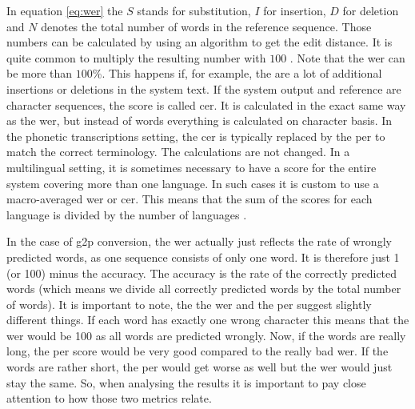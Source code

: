 In equation \ref{eq:wer} the $S$ stands for substitution, $I$ for insertion, $D$ for deletion and $N$ denotes the total number of words in the reference sequence. Those numbers can be calculated by using an algorithm to get the edit distance. It is quite common to multiply the resulting number with $100$ \citep{gorman-etal-2020-sigmorphon}. Note that the \ac{wer} can be more than $100$\%. This happens if, for example, the are a lot of additional insertions or deletions in the system text. If the system output and reference are character sequences, the score is called \acf{cer}. It is calculated in the exact same way as the \ac{wer}, but instead of words everything is calculated on character basis. In the phonetic transcriptions setting, the \ac{cer} is typically replaced by the \acf{per} to match the correct terminology. The calculations are not changed. In a multilingual setting, it is sometimes necessary to have a score for the entire system covering more than one language. In such cases it is custom to use a macro-averaged \ac{wer} or \ac{cer}. This means that the sum of the scores for each language is divided by the number of languages \citep{Leung.2021}.

In the case of \ac{g2p} conversion, the \ac{wer} actually just reflects the rate of wrongly predicted words, as one sequence consists of only one word. It is therefore just 1 (or 100) minus the accuracy. The accuracy is the rate of the correctly predicted words (which means we divide all correctly predicted words by the total number of words). It is important to note, the the \ac{wer} and the \ac{per} suggest slightly different things. If each word has exactly one wrong character this means that the \ac{wer} would be 100 as all words are predicted wrongly. Now, if the words are really long, the \ac{per} score would be very good compared to the really bad \ac{wer}. If the words are rather short, the \ac{per} would get worse as well but the \ac{wer} would just stay the same. So, when analysing the results it is important to pay close attention to how those two metrics relate.


